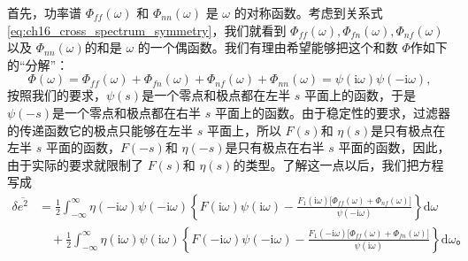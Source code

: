 首先，功率谱 $\Phi_{ff}(\omega)$ 和 $\Phi_{nn}(\omega)$ 是 $\omega$ 的对称函数。考虑到关系式\eqref{eq:ch16_cross_spectrum_symmetry}，我们就看到 $\Phi_{ff}(\omega),\Phi_{fn}(\omega),\Phi_{nf}(\omega)$以及 $\Phi_{nn}(\omega)$的和是 $\omega$ 的一个偶函数。我们有理由希望能够把这个和数 $\Phi$作如下的“分解”：
\begin{equation}
\Phi(\omega)=\Phi_{ff}(\omega)+\Phi_{fn}(\omega)+\Phi_{nf}(\omega)+\Phi_{nn}(\omega)=\psi(\mathrm{i}\omega)\psi(-\mathrm{i}\omega),
\label{eq:ch16_spectral_factorization}
\end{equation}
按照我们的要求，$\psi(s)$是一个零点和极点都在左半 $s$ 平面上的函数，于是 $\psi(-s)$是一个零点和极点都在右半 $s$ 平面上的函数。由于稳定性的要求，过滤器的传递函数它的极点只能够在左半 $s$ 平面上，所以 $F(s)$和 $\eta(s)$是只有极点在左半 $s$ 平面的函数，$F(-s)$和 $\eta(-s)$是只有极点在右半 $s$ 平面的函数，因此，由于实际的要求就限制了 $F(s)$和 $\eta(s)$的类型。了解这一点以后，我们把方程写成
\begin{equation}
\begin{aligned}
\delta\overline{e^2} &= \frac12\int_{-\infty}^{\infty}\eta(-\mathrm{i}\omega)\psi(-\mathrm{i}\omega)\left\{F(\mathrm{i}\omega)\psi(\mathrm{i}\omega)-\frac{F_1(\mathrm{i}\omega)\bigl[\Phi_{ff}(\omega)+\Phi_{nf}(\omega)\bigr]}{\psi(-\mathrm{i}\omega)}\right\}\mathrm{d}\omega \\
&\quad +\frac12\int_{-\infty}^{\infty}\eta(\mathrm{i}\omega)\psi(\mathrm{i}\omega)\left\{F(-\mathrm{i}\omega)\psi(-\mathrm{i}\omega)-\frac{F_1(-\mathrm{i}\omega)\bigl[\Phi_{ff}(\omega)+\Phi_{fn}(\omega)\bigr]}{\psi(\mathrm{i}\omega)}\right\}\mathrm{d}\omega。
\end{aligned}
\label{eq:ch16_mse_after_factor}
\end{equation}


